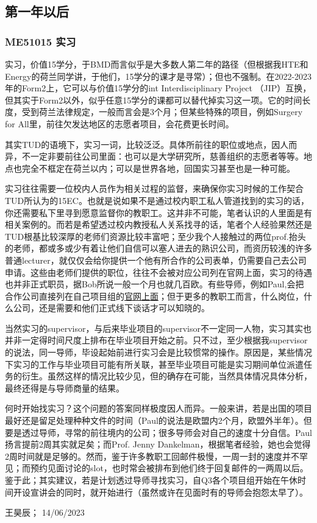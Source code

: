 \vspace{\betsubsec} %
\subsection{第一年以后}
\subsubsection{ME51015 实习}
实习，价值15学分，于BMD而言似乎是大多数人第二年的路径（但根据我HTE和Energy的荷兰同学讲，于他们，15学分的课才是寻常）；但也不强制。在2022-2023年的Form2上，它可以与价值15学分的int Interdisciplinary Project （JIP）互换，但其实于Form2以外，似乎任意15学分的课都可以替代掉实习这一项。它的时间长度，受到荷兰法律规定，一般而言会是3个月；但某些特殊的项目，例如Surgery for All里，前往欠发达地区的志愿者项目，会花费更长时间。

其实TUD的语境下，实习一词，比较泛泛。具体所前往的职位或地点，因人而异，不一定非要前往公司里面：也可以是大学研究所，慈善组织的志愿者等等。地点也完全不框定在荷兰以内；可以是世界各地，回国实习甚至也是一种可能。

实习往往需要一位校内人员作为相关过程的监督，来确保你实习时候的工作契合TUD所认为的15EC。也就是说如果不是通过校内职工私人管道找到的实习的话，你还需要私下里寻到愿意监督你的教职工。这并非不可能，笔者认识的人里面是有相关案例的。而若是希望透过校内教授私人关系找寻的话，笔者个人经验果然还是TUD根基比较深厚的老师们资源比较丰富吧；至少我个人接触过的两位prof.抬头的老师，都或多或少有着让他们自信可以塞人进去的熟识公司，而资历较浅的许多普通lecturer，就仅仅会给你提供一个他有所合作的公司表单，仍需要自己去公司申请。这些由老师们提供的职位，往往不会被对应公司列在官网上面，实习的待遇也并非正式职员，据Bob所说一般一个月也就几百欧。有些导师，例如Paul,会把合作公司直接列在自己项目组的\href{https://www.bitegroup.nl/internships/}{\uline{官网上面}}；但于更多的教职工而言，什么岗位，什么公司，还是需要和他们正式线下谈话才可以知晓的。

当然实习的supervisor，与后来毕业项目的supervisor不一定同一人物，实习其实也并非一定得时间尺度上排布在毕业项目开始之前。只不过，至少根据我supervisor的说法，同一导师，毕设起始前进行实习会是比较惯常的操作。原因是，某些情况下实习的工作与毕业项目可能有所关联，甚至毕业项目可能是实习期间单位派遣任务的衍生。虽然这样的情况比较少见，但的确存在可能，当然具体情况具体分析，最终还得是与导师商量的结果。

何时开始找实习？这个问题的答案同样极度因人而异。一般来讲，若是出国的项目最好还是留足处理种种文件的时间（Paul的说法是欧盟内2个月，欧盟外半年）。但要是透过导师，寻常的前往境内的公司；很多导师会对自己的速度十分自信。Paul扬言提前2周其实就足矣；而Prof. Jenny Dankelman，根据笔者经验，她也会觉得2周时间就是足够的。然而，鉴于许多教职工回邮件极慢，一周一封的速度并不罕见；而预约见面讨论的slot，也时常会被排布到他们终于回复邮件的一两周以后。鉴于此；其实建议，若是计划透过导师寻找实习，自Q3各个项目组开始在午休时间开设宣讲会的同时，就开始进行（虽然或许在见面时有的导师会抱怨太早了）。
\begin{flushright}
王昊辰； 14/06/2023
\end{flushright}

